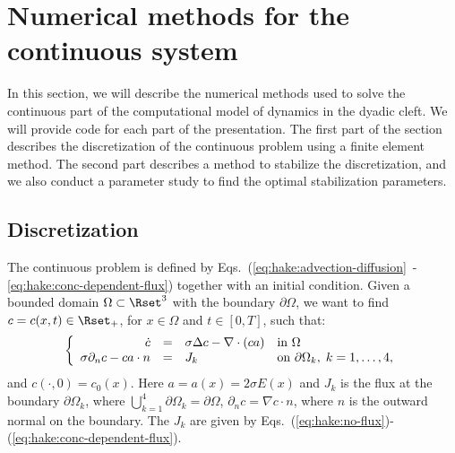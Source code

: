 \section{Numerical methods for the continuous system}
In this section, we will describe the numerical methods used to solve
the continuous part of the computational model of \Ca dynamics in the
dyadic cleft. We will provide \pydolfin code for each part of the
presentation. The first part of the section describes the
discretization of the continuous problem using a finite element
method. The second part describes a method to stabilize the
discretization, and we also conduct a parameter study to find the
optimal stabilization parameters.\par
\subsection*{Discretization}
\label{sec:hake:discretization}
The continuous problem is defined by
Eqs.~(\ref{eq:hake:advection-diffusion}~-\ref{eq:hake:conc-dependent-flux})
together with an initial condition. Given a bounded domain $\Omega
\subset \Rset^3$ with the boundary $\partial\Omega$, we want to find
$c = c(x,t) \in \Rset_+$, for $x\in \Omega$ and $t \in [0,T]$, such
that:
\begin{equation}
\label{eq:hake:full_system}
\left\{
  \begin{array}{r@{\quad=\quad}ll}
    \dot{c}&\sigma\Delta c - \nabla\cdot\left(ca\right)&  \text{in } \Omega \\
    \sigma\partial_nc-ca\cdot n&J_k& \text{on } \partial\Omega_k,\; k = 1,\ldots,4,
  \end{array}
\right.
\end{equation}
and $c(\cdot,0) = c_0(x)$. Here $a=a(x)=2\sigma E(x)$ and $J_k$ is the
\kth flux at the \kth boundary $\partial\Omega_k$, where
$\bigcup^4_{k=1}\partial\Omega_k=\partial\Omega$, $\partial_nc =
\nabla c\cdot n$, where $n$ is the outward normal on the boundary. The
$J_k$ are given by
Eqs.~(\ref{eq:hake:no-flux})-(\ref{eq:hake:conc-dependent-flux}).\par

